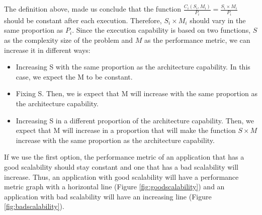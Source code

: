 The definition above, made us conclude that the function $\frac{C_{i}(S_{i},M_{i})}{P_{i}} = \frac{S_{i} \times M_{i}}{P_{i}}$ should be constant after each execution. Therefore, $S_{i} \times M_{i}$ should vary in the same proportion as $P_{i}$. Since the execution capability is based on two functions, $S$ as the complexity size of the problem and $M$ as the performance metric, we can increase it in different ways:
\begin{itemize}
\item Increasing S with the same proportion as the architecture capability. In this case, we expect the M to be constant.
\item Fixing S. Then, we is expect that M will increase with the same proportion as the architecture capability.
\item Increasing S in a different proportion of the architecture capability. Then, we expect that M will increase in a proportion that will make the function $S \times M$ increase with the same proportion as the architecture capability.
\end{itemize}

If we use the first option, the performance metric of an application that has a good scalability should stay constant and one that has a bad scalability will increase. Thus, an application with good scalability will have a performance metric graph with a horizontal line (Figure \ref{fig:goodscalability}) and an application with bad scalability will have an increasing line (Figure \ref{fig:badscalability}).

